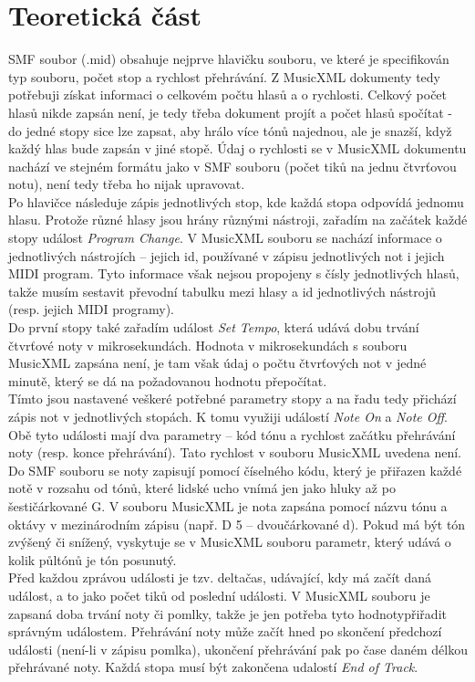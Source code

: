\documentclass[12pt,a4paper,titlepage]{article}
\begin{document}
\section{Teoretická část}
SMF soubor (.mid) obsahuje nejprve hlavičku souboru, ve které je specifikován typ souboru, počet stop a rychlost přehrávání. Z MusicXML dokumenty tedy potřebuji získat informaci o celkovém počtu hlasů a o rychlosti. Celkový počet hlasů nikde zapsán není, je tedy třeba dokument projít a počet hlasů spočítat - do jedné stopy sice lze zapsat, aby hrálo více tónů najednou, ale je snazší, když každý hlas bude zapsán v jiné stopě. Údaj o rychlosti se v MusicXML dokumentu nachází ve stejném formátu jako v SMF souboru (počet tiků na jednu čtvrťovou notu), není tedy třeba ho nijak upravovat.\\
Po hlavičce následuje zápis jednotlivých stop, kde každá stopa odpovídá jednomu hlasu. Protože různé hlasy jsou hrány různými nástroji, zařadím na začátek každé stopy událost \emph{Program Change}. V MusicXML souboru se nachází informace o jednotlivých nástrojích -- jejich id, používané v zápisu jednotlivých not i jejich MIDI program. Tyto informace však nejsou propojeny s čísly jednotlivých hlasů, takže musím sestavit převodní tabulku mezi hlasy a id jednotlivých nástrojů (resp. jejich MIDI programy).\\
Do první stopy také zařadím událost \emph{Set Tempo}, která udává dobu trvání čtvrťové noty v mikrosekundách. Hodnota v mikrosekundách s souboru MusicXML zapsána není, je tam však údaj o počtu čtvrťových not v jedné minutě, který se dá na požadovanou hodnotu přepočítat.\\
Tímto jsou nastavené veškeré potřebné parametry stopy a na řadu tedy přichází zápis not v jednotlivých stopách. K tomu využiji událostí \emph{Note On} a \emph{Note Off}. Obě tyto události mají dva parametry -- kód tónu a rychlost začátku přehrávání noty (resp. konce přehrávání). Tato rychlost v souboru MusicXML uvedena není. Do SMF souboru se noty zapisují pomocí číselného kódu, který je přiřazen každé notě v rozsahu od tónů, které lidské ucho vnímá jen jako hluky až po šestičárkované G. V souboru MusicXML je nota zapsána pomocí názvu tónu a oktávy v mezinárodním zápisu (např. D 5 -- dvoučárkované d). Pokud má být tón zvýšený či snížený, vyskytuje se v MusicXML souboru parametr, který udává o kolik půltónů je tón posunutý.\\
Před každou zprávou události je tzv. deltačas, udávající, kdy má začít daná událost, a to jako počet tiků od poslední události. V MusicXML souboru je zapsaná doba trvání noty či pomlky, takže je jen potřeba tyto hodnotypřiřadit správným událostem. Přehrávání noty může začít hned po skončení předchozí události (není-li v zápisu pomlka), ukončení přehrávání pak po čase daném délkou přehrávané noty. Každá stopa musí být zakončena udalostí \emph{End of Track}.\\
\end{document}
